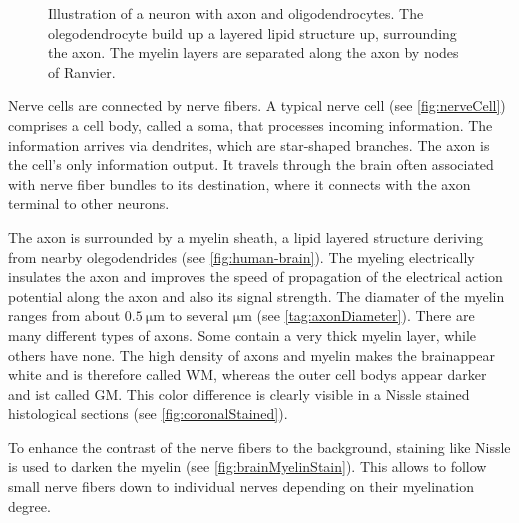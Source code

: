 \begin{figure}[!t]
\caption{Illustration of a neuron with axon and oligodendrocytes. The olegodendrocyte build up a layered lipid structure up, surrounding the axon. The myelin layers are separated along the axon by nodes of Ranvier.}
\label{fig:CortexAndNerveCell}
\end{figure}
%
Nerve cells are connected by nerve fibers.
A typical nerve cell (see \cref{fig:nerveCell}) comprises a cell body, called a soma, that processes incoming information.
The information arrives via dendrites, which are star-shaped branches.
The axon is the cell's only information output.
It travels through the brain often associated with nerve fiber bundles to its destination, where it connects with the axon terminal to other neurons.
\par
%
The axon is surrounded by a myelin sheath, a lipid layered structure deriving from nearby olegodendrides (see \cref{fig:human-brain}).
The myeling electrically insulates the axon and improves the speed of propagation of the electrical action potential along the axon and also its signal strength.
The diamater of the myelin ranges from about $\SI{0.5}{\micro\meter}$ to several $\si{\micro\meter}$ (see \cref{tag:axonDiameter}).
There are many different types of axons.
Some contain a very thick myelin layer, while others have none.
The high density of axons and myelin makes the brainappear white and is therefore called \ac{WM}, whereas the outer cell bodys appear darker and ist called \ac{GM}.
This color difference is clearly visible in a Nissle stained histological sections (see \cref{fig:coronalStained}).
\par
%
To enhance the contrast of the nerve fibers to the background, staining like Nissle is used to darken the myelin (see \cref{fig:brainMyelinStain}).
This allows to follow small nerve fibers down to individual nerves depending on their myelination degree.
